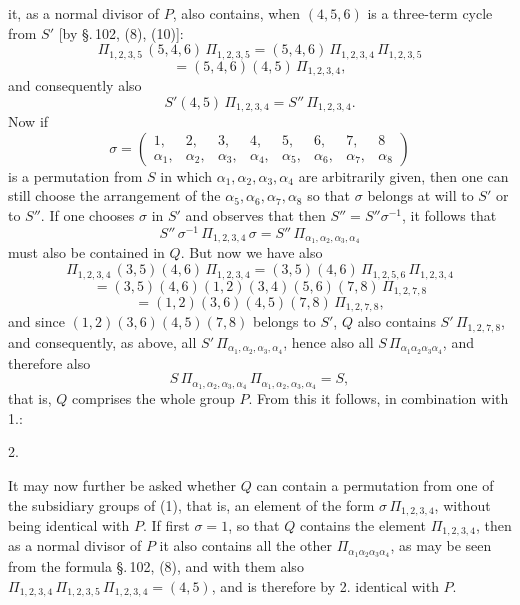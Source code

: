 
it, as a normal divisor of $P$, also contains, when $(4,5,6)$ is a three-term cycle from $S'$ [by \S.\,102, (8), (10)]:
\[
\Pi_{1,2,3,5}\,(5,4,6)\,\Pi_{1,2,3,5} = (5,4,6)\,\Pi_{1,2,3,4}\,\Pi_{1,2,3,5}
\]
\[
= (5,4,6)(4,5)\,\Pi_{1,2,3,4},
\]
and consequently also
\[
S'(4,5)\,\Pi_{1,2,3,4} = S''\,\Pi_{1,2,3,4}.
\]
Now if
\[
\sigma = \begin{pmatrix} 1, & 2, & 3, & 4, & 5, & 6, & 7, & 8 \\ \alpha_1, & \alpha_2, & \alpha_3, & \alpha_4, & \alpha_5, & \alpha_6, & \alpha_7, & \alpha_8 \end{pmatrix}
\]
is a permutation from $S$ in which $\alpha_1, \alpha_2, \alpha_3, \alpha_4$ are arbitrarily given, then one can still choose the arrangement of the $\alpha_5, \alpha_6, \alpha_7, \alpha_8$ so that $\sigma$ belongs at will to $S'$ or to $S''$. If one chooses $\sigma$ in $S'$ and observes that then $S'' = S''\sigma^{-1}$, it follows that
\[
S''\,\sigma^{-1}\,\Pi_{1,2,3,4}\,\sigma = S''\,\Pi_{\alpha_1,\alpha_2,\alpha_3,\alpha_4}
\]
must also be contained in $Q$. But now we have also
\[
\Pi_{1,2,3,4}\,(3,5)(4,6)\,\Pi_{1,2,3,4} = (3,5)(4,6)\,\Pi_{1,2,5,6}\,\Pi_{1,2,3,4}
\]
\[
= (3,5)(4,6)(1,2)(3,4)(5,6)(7,8)\,\Pi_{1,2,7,8}
\]
\[
= (1,2)(3,6)(4,5)(7,8)\,\Pi_{1,2,7,8},
\]
and since $(1,2)(3,6)(4,5)(7,8)$ belongs to $S'$, $Q$ also contains $S'\,\Pi_{1,2,7,8}$, and consequently, as above, all $S'\,\Pi_{\alpha_1,\alpha_2,\alpha_3,\alpha_4}$, hence also all $S\,\Pi_{\alpha_1\alpha_2\alpha_3\alpha_4}$, and therefore also
\[
S\,\Pi_{\alpha_1,\alpha_2,\alpha_3,\alpha_4}\,\Pi_{\alpha_1,\alpha_2,\alpha_3,\alpha_4} = S,
\]
that is, $Q$ comprises the whole group $P$. From this it follows, in combination with 1.:

2.\ 

It may now further be asked whether $Q$ can contain a permutation from one of the subsidiary groups of (1), that is, an element of the form $\sigma\,\Pi_{1,2,3,4}$, without being identical with $P$. If first $\sigma = 1$, so that $Q$ contains the element $\Pi_{1,2,3,4}$, then as a normal divisor of $P$ it also contains all the other $\Pi_{\alpha_1\alpha_2\alpha_3\alpha_4}$, as may be seen from the formula \S.\,102, (8), and with them also $\Pi_{1,2,3,4}\,\Pi_{1,2,3,5}\,\Pi_{1,2,3,4} = (4,5)$, and is therefore by 2. identical with $P$.
